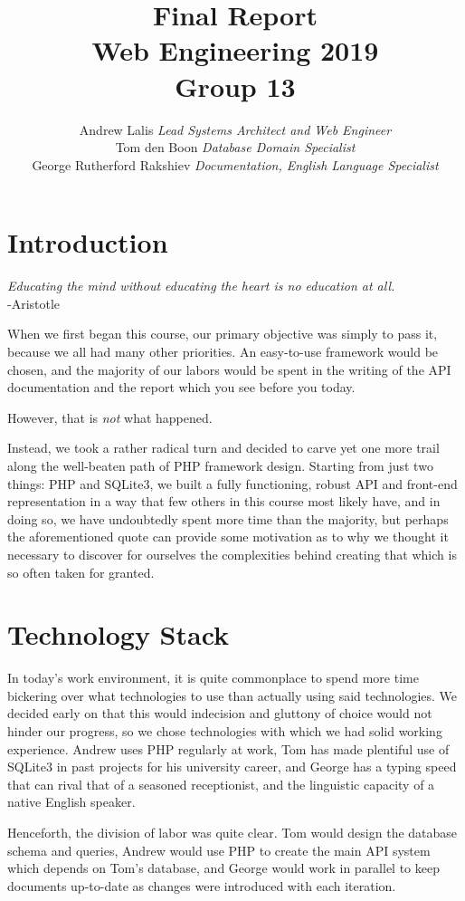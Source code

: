 \documentclass[12pt, a4paper, notitlepage]{report}
\title{Final Report\\Web Engineering 2019\\Group 13}
\author{Andrew Lalis \textit{Lead Systems Architect and Web Engineer}\\
Tom den Boon \textit{Database Domain Specialist}\\
George Rutherford Rakshiev \textit{Documentation, English Language Specialist}}
\begin{document}
	\maketitle
	
	\section*{Introduction}
		\textit{Educating the mind without educating the heart is no education at all.}\\
		-Aristotle
		
		When we first began this course, our primary objective was simply to pass it, because we all had many other priorities. An easy-to-use framework would be chosen, and the majority of our labors would be spent in the writing of the API documentation and the report which you see before you today.
		
		However, that is \textit{not} what happened.
		
		Instead, we took a rather radical turn and decided to carve yet one more trail along the well-beaten path of PHP framework design. Starting from just two things: PHP and SQLite3, we built a fully functioning, robust API and front-end representation in a way that few others in this course most likely have, and in doing so, we have undoubtedly spent more time than the majority, but perhaps the aforementioned quote can provide some motivation as to why we thought it necessary to discover for ourselves the complexities behind creating that which is so often taken for granted.
		
	\section*{Technology Stack}
		In today's work environment, it is quite commonplace to spend more time bickering over what technologies to use than actually using said technologies. We decided early on that this would indecision and gluttony of choice would not hinder our progress, so we chose technologies with which we had solid working experience. Andrew uses PHP regularly at work, Tom has made plentiful use of SQLite3 in past projects for his university career, and George has a typing speed that can rival that of a seasoned receptionist, and the linguistic capacity of a native English speaker.
		
		Henceforth, the division of labor was quite clear. Tom would design the database schema and queries, Andrew would use PHP to create the main API system which depends on Tom's database, and George would work in parallel to keep documents up-to-date as changes were introduced with each iteration.
		
\end{document}
